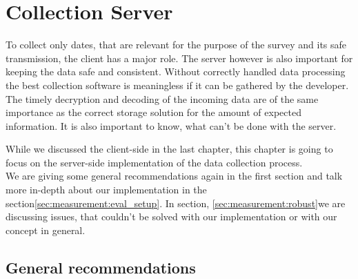 \chapter{Collection Server}
\label{chap:mmeasurement}
To collect only dates, that are relevant for the purpose of the survey and its safe transmission, the client has a major role. The server however is also important for keeping the data safe and consistent. Without correctly handled data processing the best collection software is meaningless if it can be gathered by the developer.\\
The timely decryption and decoding of the incoming data are of the same importance as the correct storage solution for the amount of expected information. It is also important to know, what can't be done with the server.

While we discussed the client-side in the last chapter, this chapter is going to focus on
the server-side implementation of the data collection process.\\
We are giving some general recommendations again in the first section and talk more in-depth about our implementation in the section\ref{sec:measurement:eval_setup}.
In section, \ref{sec:measurement:robust}we are discussing issues, that couldn't be solved with our implementation or with our concept in general.
%


\section{General recommendations}
    \label{sec:measurement:limits}
%
